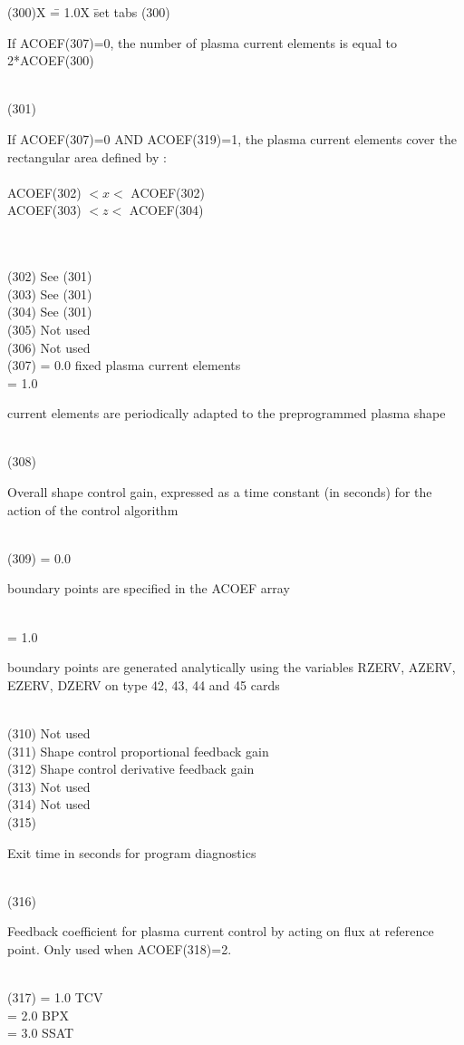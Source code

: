 \begin{tabbing}
(300)X  \= = 1.0X \= set tabs \kill
(300) \> \> \parbox[t]{\width}{If ACOEF(307)=0, the number of plasma current elements is equal
to 2*ACOEF(300)}\\
(301) \> \> \parbox[t]{\width}{If ACOEF(307)=0 AND ACOEF(319)=1, the plasma current
elements cover the rectangular area defined by : \\
 \\
 ACOEF(302) $< x <$ ACOEF(302)\\
 ACOEF(303) $< z <$ ACOEF(304) }\\
 \\
(302) \> \>See (301)\\
(303) \> \>See (301)\\
(304) \> \>See (301)\\
(305) \> \>Not used \\
(306) \> \>Not used \\
(307) \> = 0.0  \> fixed plasma current elements\\
       \>= 1.0  \> \parbox[t]{\width}{current elements are periodically adapted to the
preprogrammed plasma shape}\\
(308) \> \> \parbox[t]{\width}{Overall shape control gain, expressed as a time constant (in
seconds) for the action of the control algorithm}\\
(309) \> = 0.0 \> \parbox[t]{\width}{boundary points are specified in the ACOEF array}\\
      \> = 1.0  \>\parbox[t]{\width}{boundary points are generated analytically using the variables
RZERV, AZERV, EZERV, DZERV on type 42, 43, 44 and 45 cards}\\
(310) \> \> Not used \\
(311) \> \>Shape control proportional feedback gain \\
(312) \> \>Shape control derivative feedback gain \\
(313) \> \>Not used \\
(314) \> \>Not used \\
(315) \> \> \parbox[t]{\width}{Exit time in seconds for program diagnostics}\\
(316) \> \>\parbox[t]{\width}{Feedback coefficient for plasma current control by acting on flux
at reference point.  Only used when ACOEF(318)=2.}\\
(317) \> = 1.0  \> TCV\\
      \> = 2.0  \> BPX\\
      \> = 3.0  \> SSAT\\

\end{tabbing}

